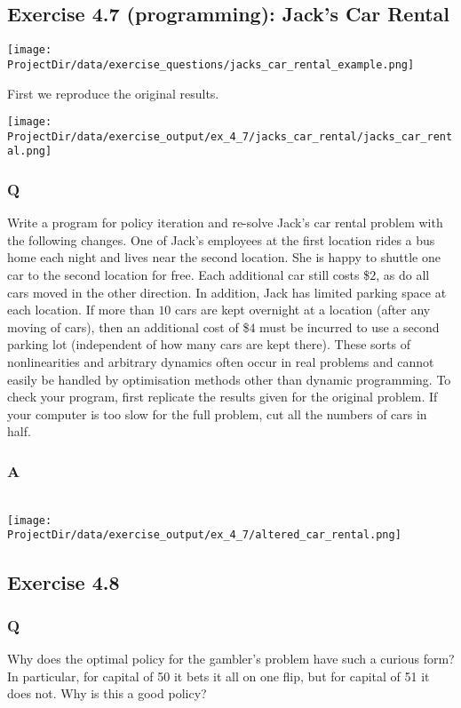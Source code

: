 \subsection{Exercise 4.7 (programming): Jack's Car Rental}

\texttt{[image: \\ProjectDir/data/exercise\_questions/jacks\_car\_rental\_example.png]}

First we reproduce the original results.

\texttt{[image: \\ProjectDir/data/exercise\_output/ex\_4\_7/jacks\_car\_rental/jacks\_car\_rental.png]}

\subsubsection{Q}
Write a program for policy iteration and re-solve Jack’s car rental problem with the following changes. One of Jack’s employees at the first location rides a bus home each night and lives near the second location. She is happy to shuttle one car to the second location for free. Each additional car still costs \$$2$, as do all cars moved in the other direction. In addition, Jack has limited parking space at each location. If more than $10$ cars are kept overnight at a location (after any moving of cars), then an additional cost of \$$4$ must be incurred to use a second parking lot (independent of how many cars are kept there). These sorts of nonlinearities and arbitrary dynamics often occur in real problems and cannot easily be handled by optimisation methods other than dynamic programming. To check your program, first replicate the results given for the original problem. If your computer is too slow for the full problem, cut all the numbers of cars in half.

\subsubsection{A}
\ProgrammingExercise\\
\texttt{[image: \\ProjectDir/data/exercise\_output/ex\_4\_7/altered\_car\_rental.png]}

\subsection{Exercise 4.8}
\subsubsection{Q}
Why does the optimal policy for the gambler’s problem have such a curious form? In particular, for capital of 50 it bets it all on one flip, but for capital of 51 it does not. Why is this a good policy?

